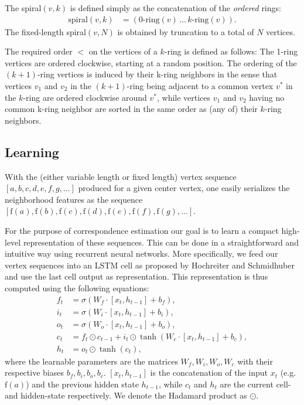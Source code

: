 \documentclass[runningheads]{llncs}
\begin{document}
The spiral$(v, k)$ is defined simply as the concatenation of the \emph{ordered} rings:
\begin{align*}
    \text{spiral}(v, k) &= (0\text{-ring}(v)  \,\dots\,  k\text{-ring}(v)).
\end{align*}
The fixed-length spiral$(v,N)$ is obtained by truncation to a total of $N$ vertices.

The required order $<$ on the vertices of a $k$-ring is defined as follows:
The 1-ring vertices are ordered clockwise, starting at a random position. The
ordering of the $(k\!+\!1)$-ring vertices is induced by their k-ring neighbors in the
sense that vertices $v_1$ and $v_2$ in the $(k\!+\!1)$-ring being adjacent to a
common vertex $v^{*}$ in the $k$-ring are ordered clockwise around $v^{*}$,
while vertices $v_1$ and $v_2$ having no common k-ring neighbor are sorted
in the same order as (any of) their $k$-ring neighbors.


\subsection{Learning}

With the (either variable length or fixed length) vertex sequence $[a, \allowbreak b,\allowbreak c,\allowbreak d,\allowbreak e,\allowbreak f,\allowbreak g, \dots]$ produced for a given center vertex, one easily serializes the neighborhood features as the sequence $[\mathrm{f}(a),\allowbreak\mathrm{f}(b),\allowbreak\mathrm{f}(c),\allowbreak\mathrm{f}(d),\allowbreak\mathrm{f}(e),\allowbreak\mathrm{f}(f),\allowbreak\mathrm{f}(g), ...]$.

For the purpose of correspondence estimation our goal is to learn a compact high-level representation of these sequences. This can be done in a straightforward and intuitive way using recurrent neural networks. More specifically, we feed our vertex sequences into an LSTM cell as proposed by Hochreiter and Schmidhuber \cite{hochreiter1997long} and use the last cell output as representation. This representation is thus computed using the following equations:
\begin{align*}
f_t &= \sigma(W_f \cdot [x_t,h_{t-1}] + b_f), \\
i_t &= \sigma(W_i \cdot [x_t,h_{t-1}] + b_i), \\
o_t &= \sigma(W_o \cdot [x_t,h_{t-1}] + b_o), \\
c_t &= f_t \odot c_{t-1} + i_t \odot \tanh(W_c \cdot [x_t,h_{t-1}] + b_c), \\
h_t &= o_t \odot \tanh(c_t),
\end{align*}
where the learnable parameters are the matrices $W_f,W_i,W_o,W_c$ with their respective biases $b_f,b_i,b_o,b_c$.
$[x_t,h_{t-1}]$ is the concatenation of the input $x_t$ (e.g. $\mathrm{f}(a)$) and the previous hidden state $h_{t-1}$, while $c_t$ and $h_t$ are the current cell- and hidden-state respectively.
We denote the Hadamard product as $\odot$.
\end{document}
